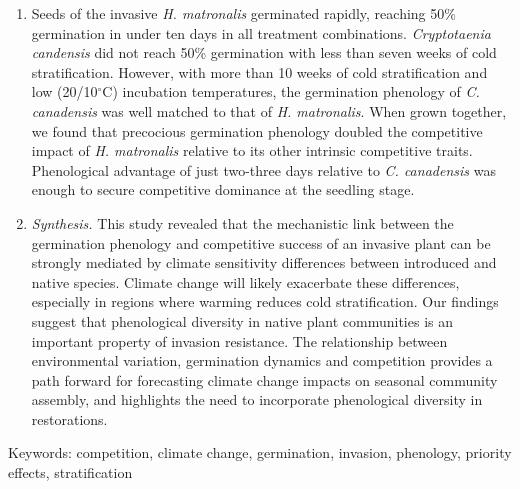 \documentclass{article}[11pt]
\begin{document}
\begin{enumerate}
\item Seeds of the invasive \textit{H. matronalis} germinated rapidly, reaching 50\% germination in under ten days in all treatment combinations. \textit{Cryptotaenia candensis} did not reach 50\% germination with less than seven weeks of cold stratification. However, with more than 10 weeks of cold stratification and low (20/10$^{\circ}$C) incubation temperatures, the germination phenology of \textit{C. canadensis} was well matched to that of \textit{H. matronalis}. When grown together, we found that precocious germination phenology doubled the competitive impact of \textit{H. matronalis} relative to its other intrinsic competitive traits. Phenological advantage of just two-three days relative to \textit{C. canadensis} was enough to secure competitive dominance at the seedling stage. %
\item \textit{Synthesis.} This study revealed that the mechanistic link between the germination phenology and competitive success of an invasive plant can be strongly mediated by climate sensitivity differences between introduced and native species. Climate change will likely exacerbate these differences, especially in regions where warming reduces cold stratification. Our findings suggest that phenological diversity in native plant communities is an important property of invasion resistance. The relationship between environmental variation, germination dynamics and competition provides a path forward for forecasting climate change impacts on seasonal community assembly, and highlights the need to incorporate phenological diversity in restorations.

\end{enumerate}

Keywords: competition, climate change, germination, invasion, phenology, priority effects, stratification

\pagebreak
\end{document}
